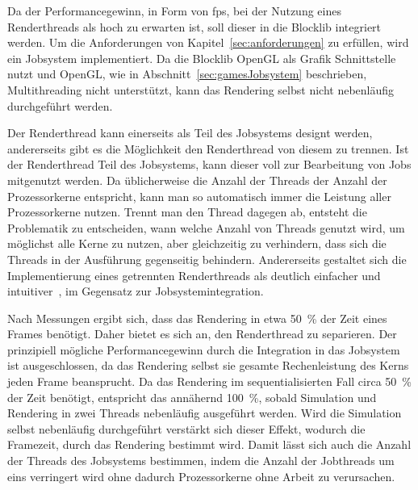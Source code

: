 Da der Performancegewinn, in Form von \ac{fps}, bei der Nutzung eines Renderthreads als hoch zu erwarten ist, soll dieser in die Blocklib integriert werden. Um die Anforderungen von Kapitel~\ref{sec:anforderungen} zu erfüllen, wird ein Jobsystem implementiert. Da die Blocklib OpenGL als Grafik Schnittstelle nutzt und OpenGL, wie in Abschnitt~\ref{sec:gamesJobsystem} beschrieben, Multithreading nicht unterstützt, kann das Rendering selbst nicht nebenläufig durchgeführt werden.

Der Renderthread kann einerseits als Teil des Jobsystems designt werden, andererseits gibt es die Möglichkeit den Renderthread von diesem zu trennen. Ist der Renderthread Teil des Jobsystems, kann dieser voll zur Bearbeitung von Jobs mitgenutzt werden. Da üblicherweise die Anzahl der Threads der Anzahl der Prozessorkerne entspricht, kann man so automatisch immer die Leistung aller Prozessorkerne nutzen. Trennt man den Thread dagegen ab, entsteht die Problematik zu entscheiden, wann welche Anzahl von Threads genutzt wird, um möglichst alle Kerne zu nutzen, aber gleichzeitig zu verhindern, dass sich die Threads in der Ausführung gegenseitig behindern. Andererseits gestaltet sich die Implementierung eines getrennten Renderthreads als deutlich einfacher und intuitiver~\cite{Tatarchuk2014}, im Gegensatz zur Jobsystemintegration.

Nach Messungen ergibt sich, dass das Rendering in etwa \SI{50}{\percent} der Zeit eines Frames benötigt. Daher bietet es sich an, den Renderthread zu separieren. Der prinzipiell mögliche Performancegewinn durch die Integration in das Jobsystem ist ausgeschlossen, da das Rendering selbst sie gesamte Rechenleistung des Kerns jeden Frame beansprucht. Da das Rendering im sequentialisierten Fall circa \SI{50}{\percent} der Zeit benötigt, entspricht das annähernd \SI{100}{\percent}, sobald Simulation und Rendering in zwei Threads nebenläufig ausgeführt werden. Wird die Simulation selbst nebenläufig durchgeführt verstärkt sich dieser Effekt, wodurch die Framezeit, durch das Rendering bestimmt wird. Damit lässt sich auch die Anzahl der Threads des Jobsystems bestimmen, indem die Anzahl der Jobthreads um eins verringert wird ohne dadurch Prozessorkerne ohne Arbeit zu verursachen.

